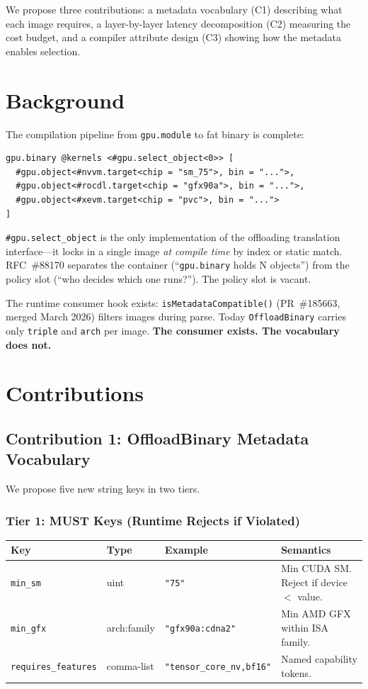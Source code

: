 \documentclass[10pt]{article}
\begin{document}
We propose three contributions: a metadata vocabulary (C1) describing what each image requires, a layer-by-layer latency decomposition (C2) measuring the cost budget, and a compiler attribute design (C3) showing how the metadata enables selection.

\section{Background}

The compilation pipeline from \texttt{gpu.module} to fat binary is complete:

\begin{lstlisting}[language=MLIR]
gpu.binary @kernels <#gpu.select_object<0>> [
  #gpu.object<#nvvm.target<chip = "sm_75">, bin = "...">,
  #gpu.object<#rocdl.target<chip = "gfx90a">, bin = "...">,
  #gpu.object<#xevm.target<chip = "pvc">, bin = "...">
]
\end{lstlisting}

\texttt{\#gpu.select\_object} is the only implementation of the offloading translation interface---it locks in a single image \textit{at compile time} by index or static match.
RFC~\#88170 separates the container (``\texttt{gpu.binary} holds N objects'') from the policy slot (``who decides which one runs?'').
The policy slot is vacant.

The runtime consumer hook exists: \texttt{isMetadataCompatible()} (PR~\#185663, merged March 2026) filters images during parse.
Today \texttt{OffloadBinary} carries only \texttt{triple} and \texttt{arch} per image.
\textbf{The consumer exists. The vocabulary does not.}

\section{Contributions}

\subsection{Contribution 1: OffloadBinary Metadata Vocabulary}

We propose five new string keys in two tiers.

\subsubsection{Tier 1: MUST Keys (Runtime Rejects if Violated)}

\begin{center}
\footnotesize
\begin{tabular}{llp{2.5cm}l}
  \toprule
  Key & Type & Example & Semantics \\
  \midrule
  \texttt{min\_sm} & uint & \texttt{"75"} & Min CUDA SM. Reject if device $<$ value. \\
  \texttt{min\_gfx} & arch:family & \texttt{"gfx90a:cdna2"} & Min AMD GFX within ISA family. \\
  \texttt{requires\_features} & comma-list & \texttt{"tensor\_core\_nv,bf16"} & Named capability tokens. \\
  \bottomrule
\end{tabular}
\normalsize
\end{center}
\end{document}
